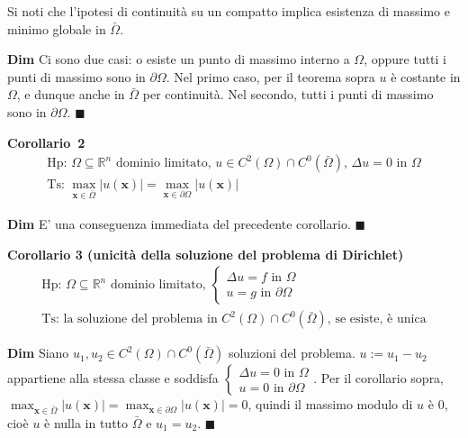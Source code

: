 \documentclass{article}
\begin{document}
Si noti che l'ipotesi di continuit\`{a} su un compatto implica esistenza di
massimo e minimo globale in $\bar{\Omega}$.

\textbf{Dim} Ci sono due casi: o esiste un punto di massimo interno a $%
\Omega $, oppure tutti i punti di massimo sono in $\partial \Omega $. Nel
primo caso, per il teorema sopra $u$ \`{e} costante in $\Omega $, e dunque
anche in $\bar{\Omega}$ per continuit\`{a}. Nel secondo, tutti i punti di
massimo sono in $\partial \Omega $. $\blacksquare $

\textbf{Corollario\ 2}%
\begin{gather*}
\text{Hp: }\Omega \subseteq 
\mathbb{R}
^{n}\text{ dominio limitato, }u\in C^{2}\left( \Omega \right) \cap
C^{0}\left( \bar{\Omega}\right) \text{, }\Delta u=0\text{ in }\Omega \\
\text{Ts: }\max_{\mathbf{x}\in \bar{\Omega}}\left\vert u\left( \mathbf{x}%
\right) \right\vert =\max_{\mathbf{x}\in \partial \Omega }\left\vert u\left( 
\mathbf{x}\right) \right\vert
\end{gather*}

\textbf{Dim} E' una conseguenza immediata del precedente corollario. $%
\blacksquare $

\textbf{Corollario 3 (unicit\`{a} della soluzione del problema di Dirichlet)}%
\begin{gather*}
\text{Hp: }\Omega \subseteq 
\mathbb{R}
^{n}\text{ dominio limitato, }\left\{ 
\begin{array}{c}
\Delta u=f\text{ in }\Omega \\ 
u=g\text{ in }\partial \Omega%
\end{array}%
\right. \\
\text{Ts: la soluzione del problema in }C^{2}\left( \Omega \right) \cap
C^{0}\left( \bar{\Omega}\right) \text{, se esiste, \`{e} unica}
\end{gather*}

\textbf{Dim} Siano $u_{1},u_{2}\in C^{2}\left( \Omega \right) \cap
C^{0}\left( \bar{\Omega}\right) $ soluzioni del problema. $u:=u_{1}-u_{2}$
appartiene alla stessa classe e soddisfa $\left\{ 
\begin{array}{c}
\Delta u=0\text{ in }\Omega \\ 
u=0\text{ in }\partial \Omega%
\end{array}%
\right. $. Per il corollario sopra, $\max_{\mathbf{x}\in \bar{\Omega}%
}\left\vert u\left( \mathbf{x}\right) \right\vert =\max_{\mathbf{x}\in
\partial \Omega }\left\vert u\left( \mathbf{x}\right) \right\vert =0$,
quindi il massimo modulo di $u$ \`{e} $0$, cio\`{e} $u$ \`{e} nulla in tutto 
$\bar{\Omega}$ e $u_{1}=u_{2}$. $\blacksquare $
\end{document}
